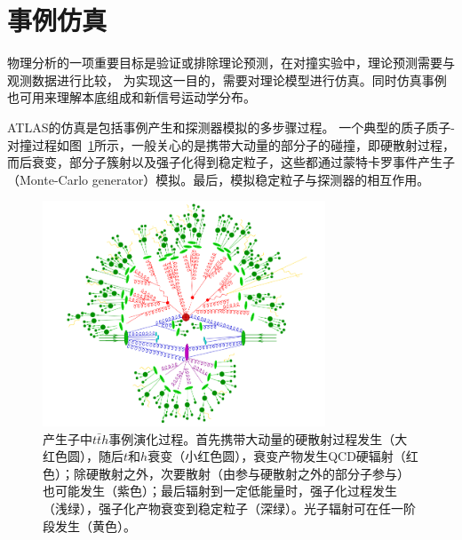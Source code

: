 \section{事例仿真}\label{sec:evt_simulation}
物理分析的一项重要目标是验证或排除理论预测，在对撞实验中，理论预测需要与观测数据进行比较，
为实现这一目的，需要对理论模型进行仿真。同时仿真事例也可用来理解本底组成和新信号运动学分布。

ATLAS的仿真是包括事例产生和探测器模拟的多步骤过程。
一个典型的质子质子-对撞过程如图~\ref{fig:evt_egen_chain}所示，一般关心的是携带大动量的部分子的碰撞，即硬散射过程，而后衰变，部分子簇射以及强子化得到稳定粒子，这些都通过蒙特卡罗事件产生子（Monte-Carlo generator）模拟\cite{BUCKLEY2011145}。最后，模拟稳定粒子与探测器的相互作用。
\begin{figure}
\centering
\includegraphics[width=0.75\textwidth]{fig/evt_egen_chain.png}
\caption{产生子中$t\bar{t}h$事例演化过程\cite{Gleisberg:2008ta}。首先携带大动量的硬散射过程发生（大红色圆），随后$t$和$h$衰变（小红色圆），衰变产物发生QCD硬辐射（红色）；除硬散射之外，次要散射（由参与硬散射之外的部分子参与）也可能发生（紫色）；最后辐射到一定低能量时，强子化过程发生（浅绿），强子化产物衰变到稳定粒子（深绿）。光子辐射可在任一阶段发生（黄色）。}
\label{fig:evt_egen_chain}
\end{figure}
